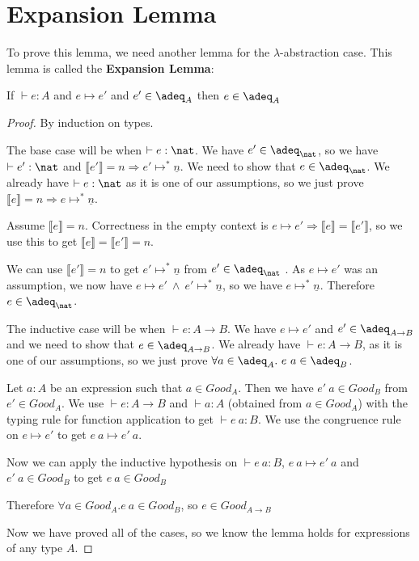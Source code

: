 \section{Expansion Lemma}

To prove this lemma, we need another lemma for the $\lambda$-abstraction case. This lemma is called the \textbf{Expansion Lemma}:

\vspace{0.5cm}

\begin{lem}\label{exp}
If $ \vdash e : A$ and $e \mapsto e'$ and $e' \in \adeq_A$ then $e \in \adeq_A$
\end{lem}

\begin{proof}
By induction on types.

The base case will be when $\vdash e :  \nat$.  We have $e' \in \adeq_{\nat}$, so we have $\vdash e' : \nat$ and $\llbracket e' \rrbracket = n \Rightarrow e' \mapsto^* \underline{n}$. We need to show that $e \in \adeq_{\nat}$. We already have $\vdash e : \nat$ as it is one of our assumptions, so we just prove $\llbracket e \rrbracket = n \Rightarrow e \mapsto^* \underline{n}$.

Assume $\llbracket e \rrbracket = n$. Correctness in the empty context is $e \mapsto e' \Rightarrow \llbracket e \rrbracket = \llbracket e' \rrbracket$, so we use this to get $\llbracket e \rrbracket = \llbracket e' \rrbracket = n$. 

We can use $\llbracket e' \rrbracket = n$ to get $e' \mapsto^* \underline{n}$ from $e' \in \adeq_{\nat}$ . As $e \mapsto e'$ was an assumption, we now have $e \mapsto e' \ \wedge \ e' \mapsto^* \underline{n}$, so we have $e \mapsto^* \underline{n}$. Therefore $e \in \adeq_{\nat}$.

\vspace{0.5cm}

The inductive case will be when $\vdash e : A \to B$. We have $e \mapsto e'$ and $e' \in \adeq_{A \to B}$ and we need to show that $e \in \adeq_{A \to B}$. We already have $\vdash e : A \to B$, as it is one of our assumptions, so we just prove $\forall a \in \adeq_A. \ e \ a \in \adeq_B$.

Let $a : A$ be an expression such that $a \in Good_A$. Then we have $e' \ a \in Good_B$ from $e' \in Good_A$. We use $\vdash e : A \to B$ and $\vdash a : A$ (obtained from $a \in Good_A$) with the typing rule for function application to get $\vdash e \ a : B$. We use the congruence rule on $e \mapsto e'$ to get $e \ a \mapsto e' \ a$. 

Now we can apply the inductive hypothesis on $\vdash e \ a : B$, $e \ a \mapsto e' \ a$ and $e' \ a \in Good_B$ to get $e \ a \in Good_B$

Therefore $\forall a \in Good_A. e \ a \in Good_B$, so $e \in Good_{A \to B}$

Now we have proved all of the cases, so we know the lemma holds for expressions of any type $A$.

\end{proof}

